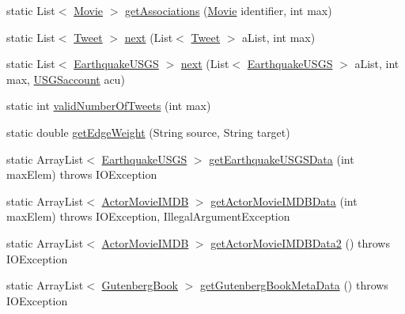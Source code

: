 \begin{DoxyCompactItemize}
static List$<$ \hyperlink{classbridges_1_1data__src__dependent_1_1_movie}{Movie} $>$ \hyperlink{classbridges_1_1connect_1_1_data_formatter_ad0377b692c07836fb1016e5fb296e79c}{get\+Associations} (\hyperlink{classbridges_1_1data__src__dependent_1_1_movie}{Movie} identifier, int max)
\item 
static List$<$ \hyperlink{classbridges_1_1data__src__dependent_1_1_tweet}{Tweet} $>$ \hyperlink{classbridges_1_1connect_1_1_data_formatter_a3d0b2d2e0384d2a537bb61fbeb3d00a4}{next} (List$<$ \hyperlink{classbridges_1_1data__src__dependent_1_1_tweet}{Tweet} $>$ a\+List, int max)
\item 
static List$<$ \hyperlink{classbridges_1_1data__src__dependent_1_1_earthquake_u_s_g_s}{Earthquake\+U\+S\+GS} $>$ \hyperlink{classbridges_1_1connect_1_1_data_formatter_ad451dd96b927702127d383e85fc98661}{next} (List$<$ \hyperlink{classbridges_1_1data__src__dependent_1_1_earthquake_u_s_g_s}{Earthquake\+U\+S\+GS} $>$ a\+List, int max, \hyperlink{classbridges_1_1data__src__dependent_1_1_u_s_g_saccount}{U\+S\+G\+Saccount} acu)
\item 
static int \hyperlink{classbridges_1_1connect_1_1_data_formatter_ad17084ac8b0f28837ebb1d77905cefb8}{valid\+Number\+Of\+Tweets} (int max)
\item 
static double \hyperlink{classbridges_1_1connect_1_1_data_formatter_a2637c733e7f4efccfb56de0940506318}{get\+Edge\+Weight} (String source, String target)
\item 
static Array\+List$<$ \hyperlink{classbridges_1_1data__src__dependent_1_1_earthquake_u_s_g_s}{Earthquake\+U\+S\+GS} $>$ \hyperlink{classbridges_1_1connect_1_1_data_formatter_a31f1f3e398fbf7225c790dbbbde238dd}{get\+Earthquake\+U\+S\+G\+S\+Data} (int max\+Elem)  throws I\+O\+Exception 
\item 
static Array\+List$<$ \hyperlink{classbridges_1_1data__src__dependent_1_1_actor_movie_i_m_d_b}{Actor\+Movie\+I\+M\+DB} $>$ \hyperlink{classbridges_1_1connect_1_1_data_formatter_aa2a84fe044615b2e1b166d412babac0f}{get\+Actor\+Movie\+I\+M\+D\+B\+Data} (int max\+Elem)  throws I\+O\+Exception, Illegal\+Argument\+Exception 
\item 
static Array\+List$<$ \hyperlink{classbridges_1_1data__src__dependent_1_1_actor_movie_i_m_d_b}{Actor\+Movie\+I\+M\+DB} $>$ \hyperlink{classbridges_1_1connect_1_1_data_formatter_a9b599616c4d7a502f9fab8663173db6d}{get\+Actor\+Movie\+I\+M\+D\+B\+Data2} ()  throws I\+O\+Exception 
\item 
static Array\+List$<$ \hyperlink{classbridges_1_1data__src__dependent_1_1_gutenberg_book}{Gutenberg\+Book} $>$ \hyperlink{classbridges_1_1connect_1_1_data_formatter_a4bd21bd830238db40b511474afc77b61}{get\+Gutenberg\+Book\+Meta\+Data} ()  throws I\+O\+Exception 

\end{DoxyCompactItemize}
